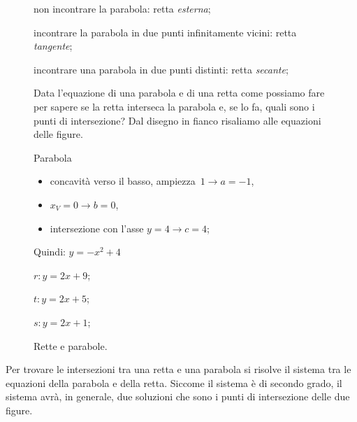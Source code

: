 \begin{figure}[h]
\begin{minipage}{.55\textwidth}
\begin{enumerate*}
 \item non incontrare la parabola: retta \emph{esterna};
 \item incontrare la parabola in due punti infinitamente vicini: retta
  \emph{tangente};
 \item incontrare una parabola in due punti distinti: retta \emph{secante};
\end{enumerate*}
Data l'equazione di una parabola e di una retta come possiamo fare per sapere
se la retta interseca la parabola e, se lo fa, quali sono i punti di 
intersezione?
Dal disegno in fianco risaliamo alle equazioni delle figure.

\begin{enumeratea}
 \item Parabola
  \begin{itemize}
   \item concavità verso il basso, ampiezza~\(1 \rightarrow a=-1\),
   \item \(x_V=0 \rightarrow b=0\),
   \item intersezione con l'asse \(y=4 \rightarrow c=4\);
  \end{itemize}
  Quindi: \(y=-x^2+4\)
 \item \(r: y=2x+9\);
 \item \(t: y=2x+5\);
 \item \(s: y=2x+1\);
\end{enumeratea}
\end{minipage}
\begin{minipage}{.40\textwidth}
\begin{inaccessibleblock}[Parabola di equazione \(y=x^2\).]
\centering
\scalebox{.9}{  \parabolaerette}
  \caption{Rette e parabole.} \label{fig:parabola_parabolaerette}
\end{inaccessibleblock}
\end{minipage}
\end{figure}

Per trovare le intersezioni tra una retta e una parabola si risolve il 
sistema tra le equazioni della parabola e della retta. Siccome il sistema è 
di secondo grado, il sistema avrà, in generale, due soluzioni che sono i 
punti di intersezione delle due figure. 

